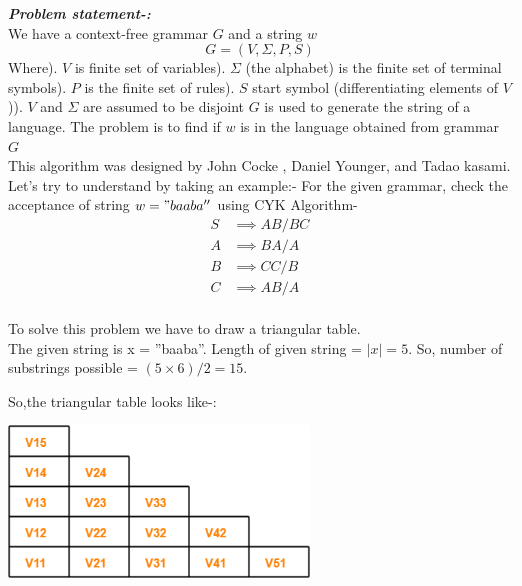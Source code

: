 \documentclass[12pt]{book}
\begin{document}
\textbf{\textit{Problem statement-:}}\\
    We have  a context-free grammar $G$ and a string $w$\\
\[G = (V, \Sigma , P, S)\]\newline
Where). $V$ is finite set of variables). $\Sigma$ (the alphabet) is the finite set of terminal symbols). $P$ is the finite set of rules). $S$ start symbol (differentiating elements of $V$)). $V$ and $\Sigma$ are assumed to be disjoint\newline
$G$ is used to generate the string of a language.\newline
The problem is to find if $w$ is in the language obtained from grammar $G$\\

This algorithm was designed by  John Cocke , Daniel Younger, and Tadao kasami.\\

Let’s try to understand by taking an example:-\newline 
For the given grammar, check the acceptance of string $w = "baaba''$ using CYK Algorithm-\newline
\begin{align*}
S &\implies AB / BC\\
A &\implies BA / A\\
B &\implies CC / B\\
C &\implies AB / A\\
\end{align*}

To solve this problem we have to draw a triangular table.\\

The given string is x = ''baaba''.\newline
Length of given string = $|x| = 5$.\newline
So, number of substrings  possible = $(5 \times 6)/2 = 15$.\newline

So,the triangular table looks like-:\\
\begin{center}
    \includegraphics[width =8cm]{CYK-1.png}    
\end{center}
\end{document}
